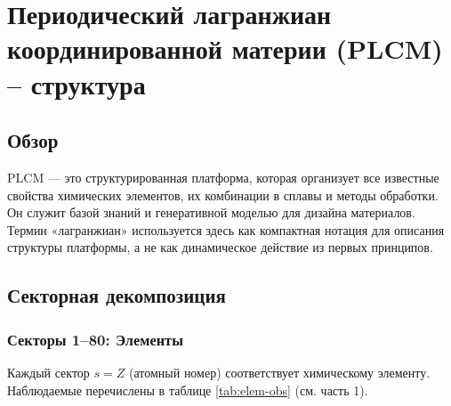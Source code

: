 \documentclass[12pt,a4paper]{article}
\begin{document}
\begin{landscape}
		\vspace{0.2cm}
		\noindent{}
		
		\vspace{0.2cm}
		\noindent\makebox[\linewidth]{%
			\scalebox{0.75}{%
				$\displaystyle
				+
				\underbrace{\lambda_{131} L_{131}^{\text{CALPHAD}}}_{\text{CALPHAD-интеграция}}
				+
				\underbrace{\sum_{s=1}^{80} \kappa_{s,131}^{\text{эл-CALPHAD}} \,\mathrm{Tr}(\Psi_{s,131} O_s^{\text{эл}} O_{131}^{\text{CALPHAD}\dagger})}_{\text{связь элемент–CALPHAD}}
				\Bigg]
				\times \prod_{i=1}^{155} \Theta(P_i - P_{i,\text{крит}})
				$
			}
		}
		\label{fig:full-lagrangian}
	\end{landscape}
	
	\section{Периодический лагранжиан координированной материи (PLCM) – структура}
	
	\subsection{Обзор}
	
	PLCM — это структурированная платформа, которая организует все известные свойства химических элементов, их комбинации в сплавы и методы обработки. Он служит базой знаний и генеративной моделью для дизайна материалов. Термин «лагранжиан» используется здесь как компактная нотация для описания структуры платформы, а не как динамическое действие из первых принципов.
	
	\subsection{Секторная декомпозиция}
	
	\subsubsection{Секторы 1–80: Элементы}
	Каждый сектор \(s = Z\) (атомный номер) соответствует химическому элементу. Наблюдаемые перечислены в таблице \ref{tab:elem-obs} (см. часть 1).
	
\end{document}

